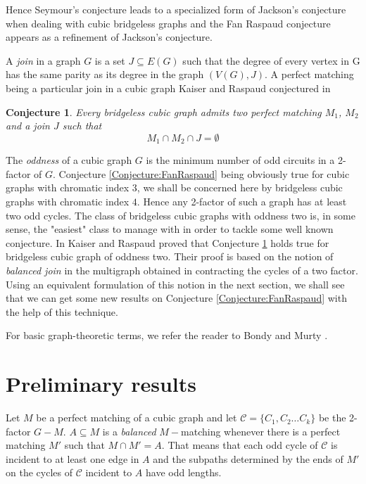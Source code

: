 \documentclass{elsart}
\theoremstyle{plain} \theoremheaderfont{\scshape}
\newtheorem{Conj}[Thm]{{\bf Conjecture}}
\begin{document}
Hence Seymour's conjecture leads to a  specialized form of Jackson's
conjecture when dealing with cubic bridgeless graphs and the Fan
Raspaud conjecture appears as a refinement of Jackson's conjecture.

 A {\em join} in a graph $G$ is a set $J \subseteq
E(G)$ such that the degree of every vertex in G has the same parity
as its degree in the graph $(V (G), J)$. A perfect matching being a
particular join in a cubic graph Kaiser and Raspaud conjectured in
\cite{KaiRas}

\begin{Conj}\cite{KaiRas} \label{Conjecture:KaiserRaspaud} Every
bridgeless cubic graph admits two perfect matching $M_1$, $M_2$ and
a join $J$ such that
$$M_1 \cap M_2 \cap J = \emptyset$$
\end{Conj}


The {\em oddness} of a cubic graph $G$ is the minimum number of odd
circuits in a 2-factor of $G$. Conjecture
\ref{Conjecture:FanRaspaud} being obviously true for cubic graphs
with chromatic index $3$, we shall be concerned here by bridgeless
cubic graphs with chromatic index $4$. Hence any 2-factor of such a
graph has at least two odd cycles. The class of  bridgeless cubic
graphs with oddness two is, in some sense, the "easiest" class to
manage with in order to tackle some well known conjecture.  In
\cite{KaiRas} Kaiser and Raspaud proved that Conjecture
\ref{Conjecture:KaiserRaspaud} holds true for bridgeless cubic graph
of oddness  two. Their proof is based on the notion of {\em balanced
join} in the multigraph obtained in contracting the cycles of a two
factor. Using an equivalent formulation of this notion in the next
section, we shall see that we can get some new results on Conjecture
\ref{Conjecture:FanRaspaud} with the help of this technique.





For basic graph-theoretic terms, we refer the reader to Bondy and
Murty \cite{BonMur}.





\section{Preliminary results}
Let $M$ be a perfect matching of a  cubic graph and let $\mathcal
C=\{C_1,C_2 \ldots C_k\}$ be the 2-factor $G-M$. $A \subseteq M$ is
a {\em balanced} $M-$matching  whenever there is a perfect matching
$M'$ such that $M \cap M' =A$. That means that each odd cycle of
$\mathcal C$ is incident to at least one edge in $A$ and the
subpaths determined by the ends of $M'$ on the cycles of $\mathcal
C$ incident to $A$ have odd lengths.
\end{document}
